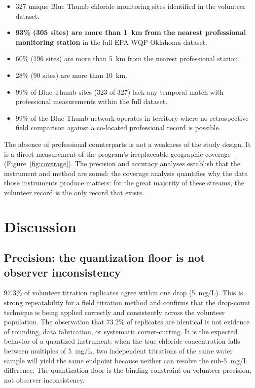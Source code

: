 \documentclass[lineno]{wlpeerj}
\begin{document}
\begin{itemize}
  \item 327 unique Blue Thumb chloride monitoring sites identified in the volunteer dataset.
  \item \textbf{93\% (305 sites) are more than 1~km from the nearest professional monitoring station} in the full EPA WQP Oklahoma dataset.
  \item 60\% (196 sites) are more than 5~km from the nearest professional station.
  \item 28\% (90 sites) are more than 10~km.
  \item 99\% of Blue Thumb sites (323 of 327) lack any temporal match with professional measurements within the full dataset.
  \item 99\% of the Blue Thumb network operates in territory where no retrospective field comparison against a co-located professional record is possible.
\end{itemize}

The absence of professional counterparts is not a weakness of the study design. It is a direct measurement of the program's irreplaceable geographic coverage (Figure~\ref{fig:coverage}). The precision and accuracy analyses establish that the instrument and method are sound; the coverage analysis quantifies why the data those instruments produce matters: for the great majority of these streams, the volunteer record is the only record that exists.

\section{Discussion}

\subsection{Precision: the quantization floor is not observer inconsistency}

97.3\% of volunteer titration replicates agree within one drop (5~mg/L). This is strong repeatability for a field titration method and confirms that the drop-count technique is being applied correctly and consistently across the volunteer population. The observation that 73.2\% of replicates are identical is not evidence of rounding, data fabrication, or systematic corner-cutting. It is the expected behavior of a quantized instrument: when the true chloride concentration falls between multiples of 5~mg/L, two independent titrations of the same water sample will yield the same endpoint because neither can resolve the sub-5~mg/L difference. The quantization floor is the binding constraint on volunteer precision, not observer inconsistency.
\end{document}
